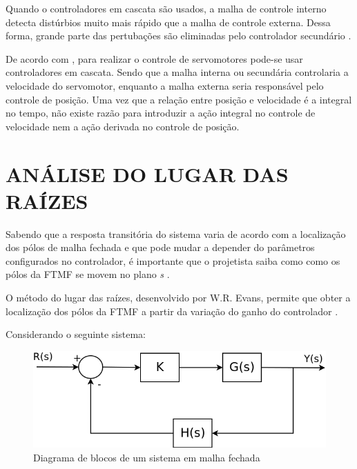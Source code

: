 \documentclass[12pt,oneside,a4paper, chapter=TITLE, section = TITLE, english, brazil]{abntex2}
\begin{document}
Quando o controladores em cascata são usados, a malha de controle interno detecta distúrbios muito mais rápido que a malha de controle externa. Dessa forma, grande parte das pertubações são eliminadas pelo controlador secundário \cite{astrom}.

De acordo com , para realizar o controle de servomotores pode-se usar controladores em cascata. Sendo que a malha interna ou secundária controlaria a velocidade do servomotor, enquanto a malha externa seria responsável pelo controle de posição. Uma vez que a relação entre posição e velocidade é a integral no tempo, não existe razão para introduzir a ação integral no controle de velocidade nem a ação derivada no controle de posição.

\section{ANÁLISE DO LUGAR DAS RAÍZES}

Sabendo que a resposta transitória do sistema varia de acordo com a localização dos pólos de malha fechada e que pode mudar a depender do parâmetros configurados no controlador, é importante que o projetista saiba como como os pólos da FTMF se movem no plano \textit{s} \cite{ogata}.

O método do lugar das raízes, desenvolvido por W.R. Evans, permite que obter a localização dos pólos da FTMF a partir da variação do ganho do controlador \cite{ogata}.

Considerando o seguinte sistema:

\begin{figure}[h] %
\centering
\includegraphics[scale=0.45]{./imagens/Malha_fechada2}
\caption[Diagrama de blocos de um sistema em malha fechada]{Diagrama de blocos de um sistema em malha fechada}
\label{fig:malha_fechada2}
\end{figure}
\end{document}

